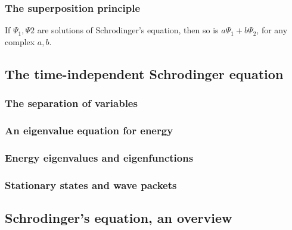 \documentclass{article}
\begin{document}
\subsubsection{The superposition principle}
If $\Psi_1, \Psi2$ are solutions of Schrodinger's equation, then so is $a\Psi_1 + b\Psi_2$, for any complex $a,b$.

\subsection{The time-independent Schrodinger equation}
\subsubsection{The separation of variables}
\subsubsection{An eigenvalue equation for energy}
\subsubsection{Energy eigenvalues and eigenfunctions}
\subsubsection{Stationary states and wave packets}
\subsection{Schrodinger's equation, an overview}
\end{document}
